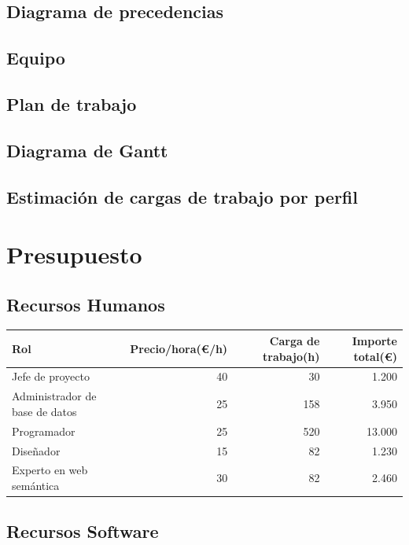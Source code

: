 \section{Diagrama de precedencias}

\section{Equipo}

\section{Plan de trabajo}

\section{Diagrama de Gantt}

\section{Estimación de cargas de trabajo por perfil}

\chapter{Presupuesto}

\section{Recursos Humanos}

\begin{center}
	\begin{tabular}{| l | r | r | r |}
		\hline
		Rol					&	Precio/hora(\euro/h)	&	Carga de trabajo(h)	&	Importe total(\euro)	\\	\hline
		Jefe de proyecto	& 	40						&	30 					& 	1.200					\\	\hline
		Administrador de base de datos &	25			&	158					&	3.950					\\	\hline
		Programador			&	25						&	520					&	13.000					\\	\hline
		Diseñador			&	15						&	82					&	1.230					\\	\hline
		Experto en web semántica	&		30			&	82					&	2.460					\\
		\hline
	\end{tabular}
\end{center}

\section{Recursos Software}

